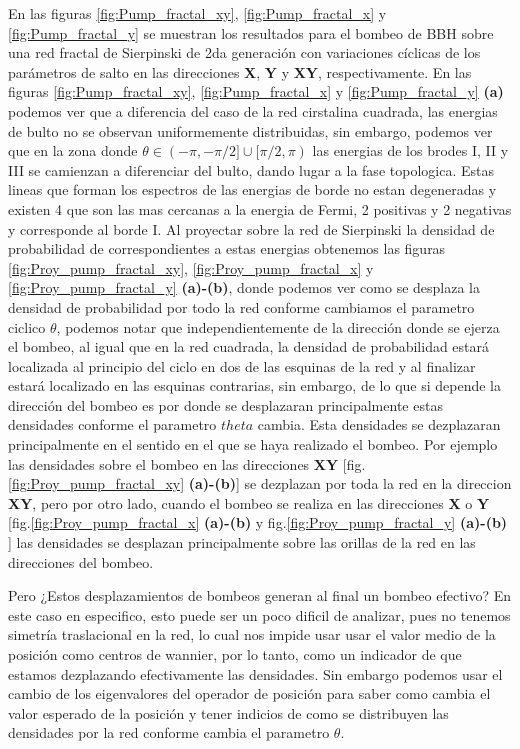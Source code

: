 En las figuras \ref{fig:Pump_fractal_xy}, \ref{fig:Pump_fractal_x} y \ref{fig:Pump_fractal_y} se muestran los resultados para el bombeo  de BBH sobre una red fractal de Sierpinski de 2da generación con variaciones cíclicas de los parámetros de salto en las direcciones \textbf{X}, \textbf{Y} y \textbf{XY}, respectivamente. En las figuras \ref{fig:Pump_fractal_xy}, \ref{fig:Pump_fractal_x} y \ref{fig:Pump_fractal_y} \textbf{(a)} podemos ver que a diferencia del caso de la red cirstalina cuadrada, las energias de bulto no se observan uniformemente distribuidas, sin embargo, podemos ver que en la zona donde $\theta \in (-\pi,-\pi/2] \cup [\pi/2,\pi)$ las energias de los brodes I, II y III se camienzan a diferenciar del bulto, dando lugar a la fase topologica. Estas lineas que forman los espectros de las energias de borde no estan degeneradas y existen 4 que son las mas cercanas a la energia de Fermi, 2 positivas y 2 negativas y corresponde al borde I. Al proyectar sobre la red de Sierpinski la densidad de probabilidad de correspondientes a estas energias obtenemos las figuras \ref{fig:Proy_pump_fractal_xy}, \ref{fig:Proy_pump_fractal_x} y  \ref{fig:Proy_pump_fractal_y} \textbf{(a)-(b)}, donde podemos ver como se desplaza la densidad de probabilidad por todo la red conforme cambiamos el parametro ciclico $\theta$, podemos notar que independientemente de la dirección donde se ejerza el bombeo, al igual que en la red cuadrada, la densidad de probabilidad estará localizada al principio del ciclo en dos de las esquinas de la red y al finalizar estará localizado en las esquinas contrarias, sin embargo, de lo que si depende la dirección del bombeo es por donde se desplazaran principalmente estas densidades conforme el parametro $theta$ cambia. Esta densidades se dezplazaran principalmente en el sentido en el que se haya realizado el bombeo. Por ejemplo las densidades sobre el bombeo en las direcciones \textbf{XY} [fig.\ref{fig:Proy_pump_fractal_xy}  \textbf{(a)-(b)}] se dezplazan por toda la red en la direccion \textbf{XY}, pero por otro lado, cuando el bombeo se realiza en las direcciones \textbf{X} o \textbf{Y} [fig.\ref{fig:Proy_pump_fractal_x}  \textbf{(a)-(b)} y fig.\ref{fig:Proy_pump_fractal_y}  \textbf{(a)-(b)} ] las densidades se desplazan principalmente sobre las orillas de la red en las direcciones del bombeo. 

Pero ¿Estos desplazamientos de bombeos generan al final un bombeo efectivo? En este caso en especifico, esto puede ser un poco dificil de analizar, pues no tenemos simetría traslacional en la red, lo cual nos impide usar usar el valor medio de la posición como centros de wannier, por lo tanto, como un indicador de que estamos dezplazando efectivamente las densidades. Sin embargo podemos usar el cambio de los eigenvalores del operador de posición para saber como cambia el valor esperado de la posición y tener indicios de como se distribuyen las densidades por la red conforme cambia el parametro $\theta$.


